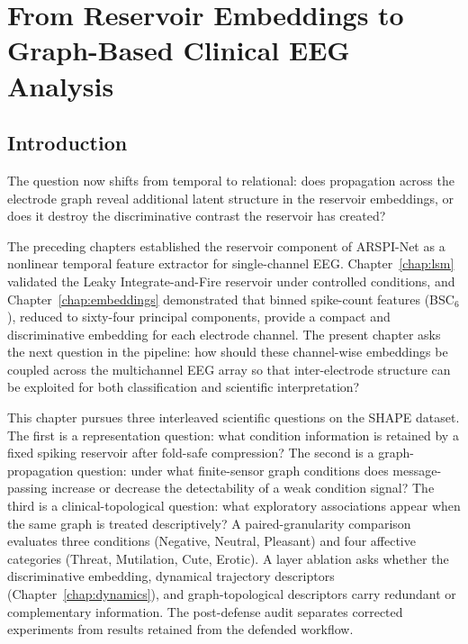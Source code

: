 \chapter{From Reservoir Embeddings to Graph-Based Clinical EEG Analysis}
\label{chap:arspi_net}

\section{Introduction}
\label{sec:ch5_intro}

The question now shifts from temporal to relational: does propagation across the electrode graph reveal additional latent structure in the reservoir embeddings, or does it destroy the discriminative contrast the reservoir has created?

The preceding chapters established the reservoir component of ARSPI-Net as a nonlinear temporal feature extractor for single-channel EEG. Chapter~\ref{chap:lsm} validated the Leaky Integrate-and-Fire reservoir under controlled conditions, and Chapter~\ref{chap:embeddings} demonstrated that binned spike-count features (BSC$_6$), reduced to sixty-four principal components, provide a compact and discriminative embedding for each electrode channel. The present chapter asks the next question in the pipeline: how should these channel-wise embeddings be coupled across the multichannel EEG array so that inter-electrode structure can be exploited for both classification and scientific interpretation?

This chapter pursues three interleaved scientific questions on the SHAPE dataset. The first is a representation question: what condition information is retained by a fixed spiking reservoir after fold-safe compression? The second is a graph-propagation question: under what finite-sensor graph conditions does message-passing increase or decrease the detectability of a weak condition signal? The third is a clinical-topological question: what exploratory associations appear when the same graph is treated descriptively? A paired-granularity comparison evaluates three conditions (Negative, Neutral, Pleasant) and four affective categories (Threat, Mutilation, Cute, Erotic). A layer ablation asks whether the discriminative embedding, dynamical trajectory descriptors (Chapter~\ref{chap:dynamics}), and graph-topological descriptors carry redundant or complementary information. The post-defense audit separates corrected experiments from results retained from the defended workflow.

